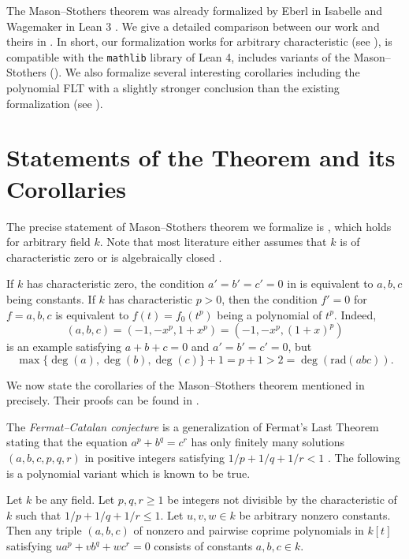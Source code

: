 \documentclass[runningheads]{llncs}
\newcommand{\rad}{\mathrm{rad}}
\begin{document}
The Mason--Stothers theorem was already formalized by Eberl in Isabelle \cite{eberl17} and Wagemaker in Lean 3 \cite{wagemaker18}.
We give a detailed comparison between our work and theirs in .
In short, our formalization works for arbitrary characteristic (see ), is compatible with the \texttt{mathlib} library of Lean 4, includes variants of the Mason--Stothers (). We also formalize several interesting corollaries including the polynomial FLT with a slightly stronger conclusion than the existing formalization (see ).



\section{Statements of the Theorem and its Corollaries}
\label{sec:statements}

The precise statement of Mason--Stothers theorem we formalize is , which holds for arbitrary field $k$.
Note that most literature either assumes that $k$ is of characteristic zero or is algebraically closed \cite{stothers81,snyder00}.

If $k$ has characteristic zero, the condition $a' = b' = c' = 0$ in  is equivalent to $a, b, c$ being constants.
If $k$ has characteristic $p > 0$, then the condition $f' = 0$ for $f = a, b, c$ is equivalent to $f(t) = f_0(t^p)$ being a polynomial of $t^p$.
Indeed,
$$
(a, b, c) = (-1, -x^p, 1 + x^p) = (-1, -x^p, (1 + x)^p)
$$ is an example satisfying $a + b + c = 0$ and $a' = b' = c' = 0$, but
$$
\max\{\deg(a), \deg(b), \deg(c)\} + 1 = p + 1 > 2 = \deg (\rad(abc)).
$$

We now state the corollaries of the Mason--Stothers theorem mentioned in  precisely.
Their proofs can be found in .

The \emph{Fermat--Catalan conjecture} is a generalization of Fermat's Last Theorem stating that the equation $a^p + b^q = c^r$ has only finitely many solutions $(a, b, c, p, q, r)$ in positive integers satisfying $1/p + 1/q + 1/r < 1$ \cite{granville02}. 
The following  is a polynomial variant which is known to be true.

\begin{theorem}
\label{cor:fermat-catalan}
Let $k$ be any field.
Let $p, q, r \geq 1$ be integers not divisible by the characteristic of $k$
such that $1/p + 1/q + 1/r \leq 1$.
Let $u, v, w \in k$ be arbitrary nonzero constants.
Then any triple $(a, b, c)$ of nonzero and pairwise coprime polynomials in $k[t]$ satisfying $ua^p + vb^q + wc^r = 0$ consists of constants $a, b, c \in k$.
\end{theorem}
\end{document}
